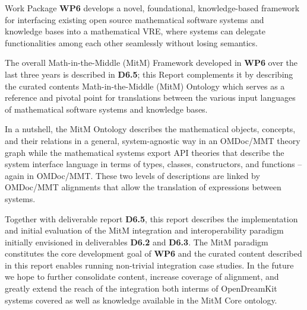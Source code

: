 Work Package \textbf{WP6} develops a novel, foundational, knowledge-based framework for interfacing existing open source mathematical software systems and knowledge bases into a mathematical VRE, where systems can delegate functionalities among each other seamlessly without losing semantics.

The overall Math-in-the-Middle (MitM) Framework developed in \textbf{WP6} over the last three years is described in \textbf{D6.5}; this Report complements it by describing the curated contents Math-in-the-Middle (MitM) Ontology which serves as a reference and pivotal point for translations between the various input languages of mathematical software systems and knowledge bases.

In a nutshell, the MitM Ontology describes the mathematical objects, concepts, and their relations in a general, system-agnostic way in an OMDoc/MMT theory graph while the mathematical systems export API theories that describe the system interface language in terms of types, classes, constructors, and functions -- again in OMDoc/MMT.
These two levels of descriptions are linked by OMDoc/MMT alignments that allow the translation of expressions between systems.

Together with deliverable report \textbf{D6.5}, this report describes the implementation and initial evaluation of the MitM integration and interoperability paradigm initially envisioned in deliverables \textbf{D6.2} and \textbf{D6.3}. The MitM paradigm constitutes the core development goal of \textbf{WP6} and the curated content described in this report enables running non-trivial integration case studies. In the future we hope to further consolidate content, increase coverage of alignment, and greatly extend the reach of the integration both interms of OpenDreamKit systems covered as well as knowledge available in the MitM Core ontology. 


